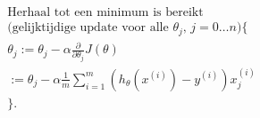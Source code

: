 \[
\begin{aligned}
& \textrm{Herhaal tot een minimum is bereikt}\\
& \textrm{(gelijktijdige update voor alle $\theta_j$, $j=0 \hdots n$)}\{\\
& \theta_j := \theta_j - \alpha \frac{\partial}{{\partial}{\theta_j}}J(\theta) \\
& := \theta_j - \alpha \frac{1}{m}\sum_{i=1}^{m} (h_\theta(x^{(i)}) - y^{(i)})x_j^{(i)}\\
&\} .
\end{aligned}
\]

